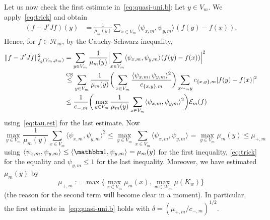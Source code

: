 \documentclass[12pt,reqno,a4paper]{amsart}            %
\numberwithin{equation}{section}
\newcommand{\myfont}{\sffamily}
\theoremstyle{mythmstyle}       %
\theoremstyle{mydefstyle}        %
\let\oldendproof\endproof
\renewenvironment{proof}[1][\bfseries\myfont\proofname]{%
  \oldproof[\bfseries \myfont #1]%
}{\oldendproof}
\newcommand{\Thm}[1]{Theorem~\ref{thm:#1}}
\newcommand{\abssqr}[2][{}]{\lvert{#2}\rvert^2_{#1}} %
\newcommand{\Bigabssqr}[2][{}]{\Bigl\lvert{#2}\Bigr\rvert^2_{#1}}%
\newcommand{\normsymb}{\|}
\newcommand{\normsqr}[2][{}]{\normsymb{#2}\normsymb^2_{#1}} %
\newcommand{\iprod}[3][{}]{\langle{#2},{#3}\rangle_{#1}}  %
\newcommand{\1}{\mathbbm 1}                    %
\newcommand{\leCS}{\stackrel{\mathrm{CS}}\le}
\newcommand{\HS}{\mathscr H}           %
\newcommand{\lsymb}    {\ell}          %
\newcommand{\lpspace}[1][p]    {\lsymb_{#1}}     %
\newcommand{\lsqrspace}    {\lpspace[2]}          %
\newcommand{\lsqr}[2][{}]{\lsqrspace^{#1}({#2})}   %
\newcommand{\energy}{\mathcal E}
\newcommand{\conductance}{c}  %
\begin{document}
\begin{proof}[Proof of \Thm{main}]
  Let us now check the first estimate in~\eqref{eq:quasi-uni.b}: Let
  $y\in V_m$. We apply~\eqref{eq:trick} and obtain
  \begin{align*}
    (f-J'Jf)(y)&
    =\frac{1}{\mu_m(y)}\sum_{x \in V_m}\iprod
    {\psi_{x,m}}{\psi_{y,m}}(f(y)-f(x)).
  \end{align*}
  Hence, for $f\in\HS_m$, by the Cauchy-Schwarz inequality,
  \begin{align*}
    \normsqr[\lsqr{V_m,\mu_m}]{f-J'Jf}
    &=\sum_{y\in V_m}\frac{1}{\mu_m(y)}
      \Bigabssqr{\sum_{x \in V_m} \iprod {\psi_{x,m}}{\psi_{y,m}} (f(y)-f(x))}\\
    &\leCS \sum_{y\in V_m} \frac 1{\mu_m(y)} 
       \bigg(\sum_{x \in V_m}
         \frac{\iprod {\psi_{x,m}}{\psi_{y,m}}^2}{\conductance_{\{x,y\},m}}\bigg)
           \sum_{x \sim_m y} \conductance_{\{x,y\},m} \abssqr{f(y)-f(x)}\\
    &\le \frac 1 {\conductance_{-,m}} 
    \bigg(\max_{y\in V_m}\frac 1{\mu_m(y)}\sum_{x \in V_m}
            \iprod {\psi_{x,m}}{\psi_{y,m}}^2
    \bigg) \energy_m(f)
  \end{align*}
  using~\eqref{eq:tau.est} for the last estimate.  Now
  \begin{equation*}
    \max_{y\in V_m}\frac 1{\mu_m(y)}\sum_{x \in V_m} 
                  \iprod {\psi_{x,m}}{\psi_{y,m}}^2
    \le \max_{y\in V_m}  \sum_{x \in V_m} \iprod {\psi_{x,m}}{\psi_{y,m}}
    = \max_{y \in V_m} \mu_m(y)
    \le \mu_{+,m}
  \end{equation*}
  using $\iprod{\psi_{x,m}}{\psi_{y,m}} \le \iprod{\1}{\psi_{y,m}} =
  \mu_m(y)$ for the first inequality, \eqref{eq:trick} for the
  equality and $\psi_{y,m}\le 1$ for the last inequality.  Moreover,
  we have estimated $\mu_m(y)$ by
  \begin{equation}
    \label{eq:mu.m.pm}
    \mu_{+,m} 
    := \max \bigl\{
    \max_{x \in V_m} \mu_m(x),
    \max_{w \in W_m} \mu(K_w)
    \bigr\}
  \end{equation}
  (the reason for the second term will become clear in a moment).  In
  particular, the first estimate in~\eqref{eq:quasi-uni.b} holds with
  $\delta=(\mu_{+,m}/\conductance_{-,m})^{1/2}$.


\end{proof}
\end{document}
